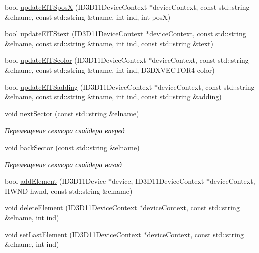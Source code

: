 \begin{DoxyCompactItemize}
\item 
bool \hyperlink{class_interface_class_a0e56b584a0bd77ad848076e468145ea9}{update\+El\+T\+SposX} (I\+D3\+D11\+Device\+Context $\ast$device\+Context, const std\+::string \&elname, const std\+::string \&tname, int ind, int posX)
\item 
bool \hyperlink{class_interface_class_ab4cfcddbc203b0efebc9a4e4edf18a79}{update\+El\+T\+Stext} (I\+D3\+D11\+Device\+Context $\ast$device\+Context, const std\+::string \&elname, const std\+::string \&tname, int ind, const std\+::string \&text)
\item 
bool \hyperlink{class_interface_class_acb88069f5da083e4c90c75bd6a3be0b5}{update\+El\+T\+Scolor} (I\+D3\+D11\+Device\+Context $\ast$device\+Context, const std\+::string \&elname, const std\+::string \&tname, int ind, D3\+D\+X\+V\+E\+C\+T\+O\+R4 color)
\item 
bool \hyperlink{class_interface_class_a934c0b84ea99d4d91ee3789d4ab16b3e}{update\+El\+T\+Sadding} (I\+D3\+D11\+Device\+Context $\ast$device\+Context, const std\+::string \&elname, const std\+::string \&tname, int ind, const std\+::string \&adding)
\item 
void \hyperlink{class_interface_class_abf7f2d3ebf23ef44e6f3c02e58aba3bc}{next\+Sector} (const std\+::string \&elname)
\begin{DoxyCompactList}\small\item\em Перемещение сектора слайдера вперед \end{DoxyCompactList}\item 
void \hyperlink{class_interface_class_a2d03a5b3d02f439c50326140e2dc518f}{back\+Sector} (const std\+::string \&elname)
\begin{DoxyCompactList}\small\item\em Перемещение сектора слайдера назад \end{DoxyCompactList}\item 
bool \hyperlink{class_interface_class_a54ca6130ae5cf8f7d1d82ccbe729d731}{add\+Element} (I\+D3\+D11\+Device $\ast$device, I\+D3\+D11\+Device\+Context $\ast$device\+Context, H\+W\+ND hwnd, const std\+::string \&elname)
\item 
void \hyperlink{class_interface_class_aa6b191f8e965b3990438abb05efc35ce}{delete\+Element} (I\+D3\+D11\+Device\+Context $\ast$device\+Context, const std\+::string \&elname, int ind)
\item 
void \hyperlink{class_interface_class_a84f35760eb20a52f0a3c7b8d3cb70cc0}{set\+Last\+Element} (I\+D3\+D11\+Device\+Context $\ast$device\+Context, const std\+::string \&elname, int ind)

\end{DoxyCompactItemize}
